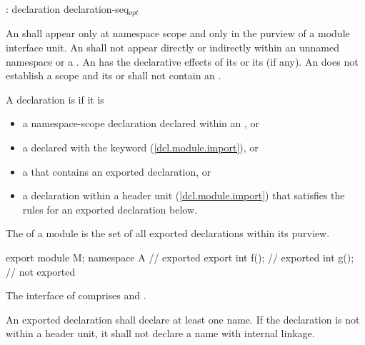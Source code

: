 \begin{std.txt}\color{addclr}
  \begin{bnf}\color{addclr}
    :\br
       declaration\br 
       \terminal{\{} declaration-seq${}_{opt}$ \terminal{\}} 
  \end{bnf}

  \resetalinea[0]
  \alinea 
  An  shall appear only
  at namespace scope and only in the purview of a module interface unit. 
  An  shall not appear directly
  or indirectly within an unnamed namespace
  or a .
  An 
  has the declarative effects of its 
  or its  (if any).
  An  does not
  establish a scope and its 
  or 
  shall not contain an .

  \alinea
  A declaration is  if it is
  \begin{itemize}\color{addclr}
  \item a namespace-scope declaration declared within an
        , or
  \item a  declared with
        the  keyword (\ref{dcl.module.import}), or
  \item a  that contains an
        exported declaration, or
  \item a declaration within a header unit (\ref{dcl.module.import})
        that satisfies the rules for an exported declaration below.
  \end{itemize}
  The  of a module  is the set of all
  exported declarations within its purview.
  \begin{example}
  \begin{codeblock}
  export module M;
  namespace A {         // exported
    export int f();     // exported
    int g();            // not exported
  }
  \end{codeblock}
  The interface of  comprises  and .
  \end{example}

  \alinea
  An exported declaration shall declare at least one name.
  If the declaration is not within a header unit,
  it shall not declare a name with internal linkage.


\end{std.txt}
